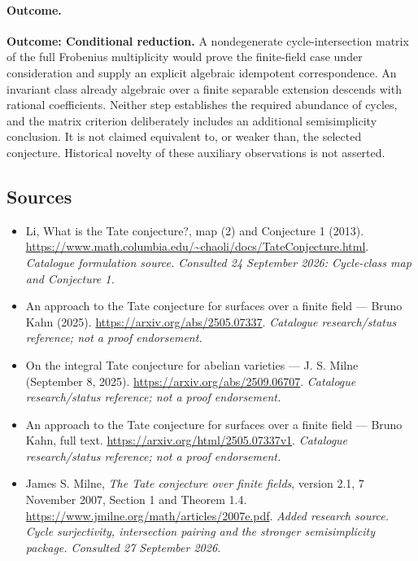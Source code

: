 \documentclass[11pt,a4paper]{article}
\begin{document}
\paragraph{Outcome.}
\textbf{Outcome: Conditional reduction.}
A nondegenerate cycle-intersection matrix of the full Frobenius
multiplicity would prove the finite-field case under consideration and
supply an explicit algebraic idempotent correspondence. An invariant class already
algebraic over a finite separable extension descends with rational
coefficients. Neither step establishes the required abundance of cycles,
and the matrix criterion deliberately includes an additional
semisimplicity conclusion. It is not claimed equivalent to, or weaker
than, the selected conjecture. Historical novelty of these auxiliary
observations is not asserted.
\subsection{Sources}
\begin{itemize}\raggedright
\item[\textnormal{[S1]}]\hypertarget{source:30006680:1}{} Li, What is the Tate conjecture?, map (2) and Conjecture 1 (2013).
\url{https://www.math.columbia.edu/~chaoli/docs/TateConjecture.html}.
{\small\textit{Catalogue formulation source. Consulted 24 September 2026: Cycle-class map and Conjecture 1.}}
\item[\textnormal{[S2]}]\hypertarget{source:30006680:2}{} An approach to the Tate conjecture for surfaces over a finite field — Bruno Kahn (2025).
\url{https://arxiv.org/abs/2505.07337}.
{\small\textit{Catalogue research/status reference; not a proof endorsement.}}
\item[\textnormal{[S3]}]\hypertarget{source:30006680:3}{} On the integral Tate conjecture for abelian varieties — J. S. Milne (September 8, 2025).
\url{https://arxiv.org/abs/2509.06707}.
{\small\textit{Catalogue research/status reference; not a proof endorsement.}}
\item[\textnormal{[S4]}]\hypertarget{source:30006680:4}{} An approach to the Tate conjecture for surfaces over a finite field — Bruno Kahn, full text.
\url{https://arxiv.org/html/2505.07337v1}.
{\small\textit{Catalogue research/status reference; not a proof endorsement.}}
\item[\textnormal{[E1]}]\hypertarget{extra:30006680:1}{} James S. Milne, \emph{The Tate conjecture over finite fields}, version 2.1, 7 November 2007, Section 1 and Theorem 1.4.
\url{https://www.jmilne.org/math/articles/2007e.pdf}.
{\small\textit{Added research source. Cycle surjectivity, intersection pairing and the stronger semisimplicity package. Consulted 27 September 2026.}}
\end{itemize}

\end{document}
